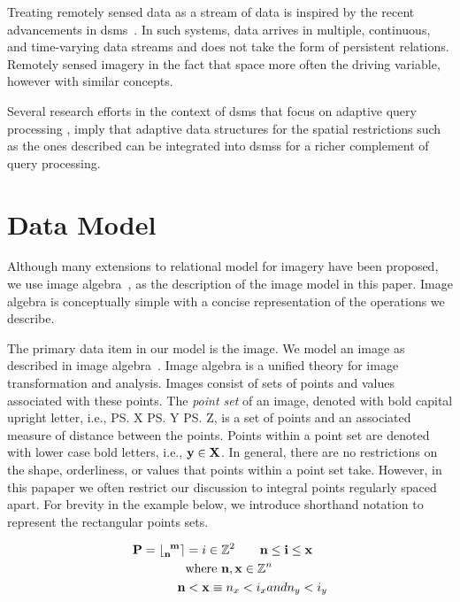\documentclass{sig-alternate}
\begin{document}
Treating remotely sensed data as a stream of data is inspired by the
recent advancements in \acl{dsms}~\cite{babcoc02model-issues,
  carney02monit-stream, heller00adapt-query}. In such systems, data
arrives in multiple, continuous, and time-varying data streams and
does not take the form of persistent relations.  Remotely sensed
imagery in the fact that space more often the driving variable,
however with similar concepts.

Several research efforts in the context of \ac{dsms} that focus on
adaptive query processing
\cite{chen02desig-evaluat,madden02contin-adapt,shah03flux}, imply that
adaptive data structures for the spatial restrictions such as the ones
described can be integrated into \acp{dsms} for a richer complement of
query processing.

\section{Data Model}
\label{sec:model}

Although many extensions to relational model for imagery have been
proposed, we use image algebra~\cite{wilson01handb-comput,
  ritter99image-algeb}, as the description of the image model in this
paper.  Image algebra is conceptually simple with a concise
representation of the operations we describe.

The primary data item in our model is the image.  We model an image as
described in image
algebra~\cite{ritter99image-algeb,wilson01handb-comput}.  Image
algebra is a unified theory for image transformation and analysis.
Images consist of sets of points and values associated with these
points.  The \emph{point set} of an image, denoted with bold capital
upright letter, i.e., \ps{X} \ps{Y} \ps{Z}, is a set of points and an
associated measure of distance between the points.  Points within a
point set are denoted with lower case bold letters, i.e., $\pt{y} \in
\ps{X}$.  In general, there are no restrictions on the shape,
orderliness, or values that points within a point set take.  However,
in this papaper we often restrict our discussion to integral points
regularly spaced apart.  For brevity in the example below, we
introduce shorthand notation to represent the rectangular points sets.

\begin{align*}
\ps{P} = \RPSnx{n}{m} &= {i \in \Z[2] \qquad \pt{n} \le \pt{i} \le \pt{x}}  \\
& \text{where } \pt{n},\pt{x} \in \Z[n] \\
\pt{n} &< \pt{x} \equiv n_x < i_x and n_y < i_y
\end{align*}
\end{document}
